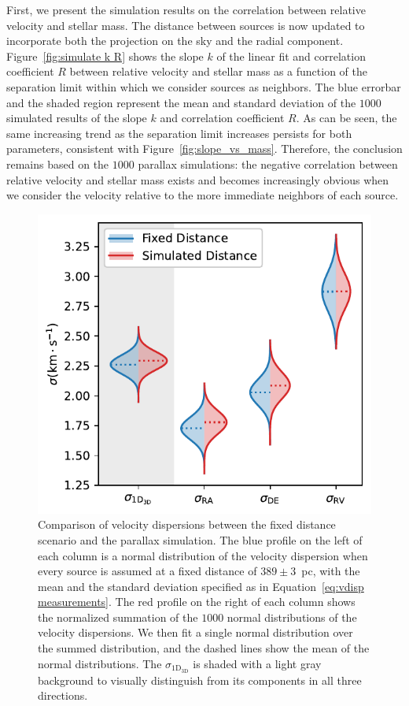 \documentclass[12pt]{ucsddissertation}
\begin{document}
\begin{CJK*}{UTF8}{gbsn}
First, we present the simulation results on the correlation between relative velocity and stellar mass. The distance between sources is now updated to incorporate both the projection on the sky and the radial component. Figure~\ref{fig:simulate k R} shows the slope $k$ of the linear fit and correlation coefficient $R$ between relative velocity and stellar mass as a function of the separation limit within which we consider sources as neighbors. The blue errorbar and the shaded region represent the mean and standard deviation of the $1000$ simulated results of the slope $k$ and correlation coefficient $R$. As can be seen, the same increasing trend as the separation limit increases persists for both parameters, consistent with Figure~\ref{fig:slope_vs_mass}. Therefore, the conclusion remains based on the $1000$ parallax simulations: the negative correlation between relative velocity and stellar mass exists and becomes increasingly obvious when we consider the velocity relative to the more immediate neighbors of each source.



\begin{figure}[htb!]
    \centering
    \includegraphics[width=0.7\linewidth]{figures/chapter1/vdisp_simulate.pdf}
    \caption[Comparison of velocity dispersions between the fixed distance scenario and the parallax simulation]{Comparison of velocity dispersions between the fixed distance scenario and the parallax simulation. The blue profile on the left of each column is a normal distribution of the velocity dispersion when every source is assumed at a fixed distance of $389\pm3$~pc, with the mean and the standard deviation specified as in Equation~\ref{eq:vdisp measurements}. The red profile on the right of each column shows the normalized summation of the $1000$ normal distributions of the velocity dispersions. We then fit a single normal distribution over the summed distribution, and the dashed lines show the mean of the normal distributions. The $\sigma_\mathrm{1D_{3D}}$ is shaded with a light gray background to visually distinguish from its components in all three directions.}
    \label{fig:vdisp simulate}
\end{figure}


\end{CJK*}
\end{document}
